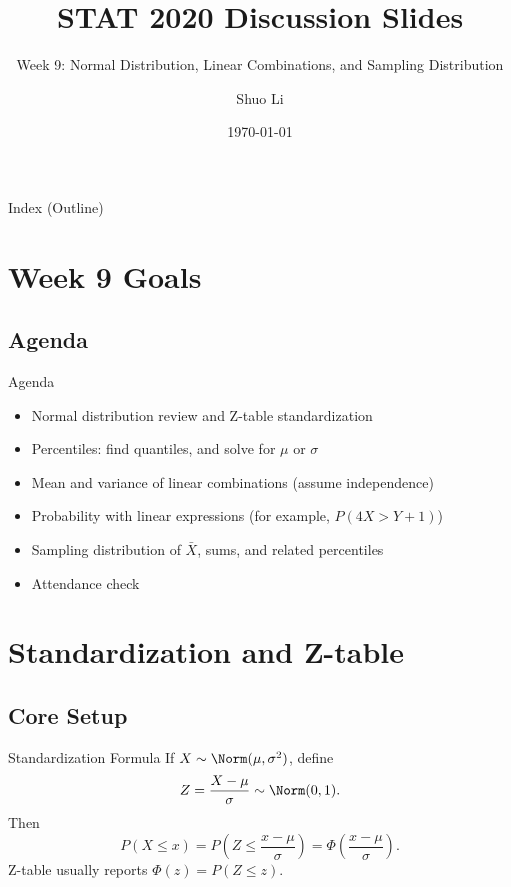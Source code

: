 \documentclass[aspectratio=169]{beamer}
\title[STAT 2020 Week 9 \hfill \insertframenumber/\inserttotalframenumber]{STAT 2020 Discussion Slides}
\subtitle{Week 9: Normal Distribution, Linear Combinations, and Sampling Distribution}
\author{Shuo Li}
\institute{University of Iowa}
\date{\today}
\begin{document}
\begin{frame}
  \titlepage
\end{frame}

\begin{frame}{Index (Outline)}
  \tableofcontents[hideallsubsections]
\end{frame}

\section{Week 9 Goals}

\subsection{Agenda}
\begin{frame}{Agenda}
  \begin{itemize}
    \item Normal distribution review and Z-table standardization
    \item Percentiles: find quantiles, and solve for \(\mu\) or \(\sigma\)
    \item Mean and variance of linear combinations (assume independence)
    \item Probability with linear expressions (for example, \(P(4X>Y+1)\))
    \item Sampling distribution of \(\bar X\), sums, and related percentiles
    \item Attendance check
  \end{itemize}
\end{frame}

\section{Standardization and Z-table}

\subsection{Core Setup}
\begin{frame}{Standardization Formula}
  If \(X\sim\Norm(\mu,\sigma^2)\), define
  \[
    Z=\frac{X-\mu}{\sigma}\sim\Norm(0,1).
  \]
  Then
  \[
    P(X\le x)=P\!\left(Z\le \frac{x-\mu}{\sigma}\right)=\Phi\!\left(\frac{x-\mu}{\sigma}\right).
  \]
  \vspace{2mm}
  Z-table usually reports \(\Phi(z)=P(Z\le z)\).
\end{frame}
\end{document}
